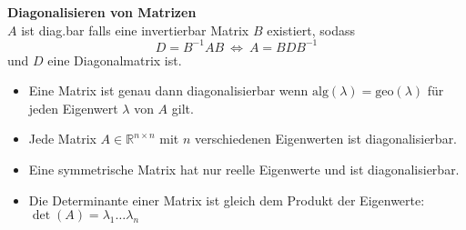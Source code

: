 \documentclass[german, 6pt]{latex4ei/latex4ei_sheet}
\begin{document}
\begin{minipage}{\columnwidth}
\textbf{Diagonalisieren von Matrizen}\\
$A$ ist diag.bar falls eine invertierbar Matrix $B$ existiert, sodass
\begin{equation*}
D=B^{-1}AB \ \Leftrightarrow \ A=BDB^{-1}
\end{equation*}
und $D$ eine Diagonalmatrix ist.
\begin{itemize}\itemsep0pt
\item Eine Matrix ist genau dann diagonalisierbar wenn $\text{alg}(\lambda)=\text{geo}(\lambda)$ für jeden Eigenwert $\lambda$ von $A$ gilt.
\item Jede Matrix $A \in \mathbb{R}^{n\times n}$ mit $n$ verschiedenen Eigenwerten ist diagonalisierbar.
\item Eine symmetrische Matrix hat nur reelle Eigenwerte und ist diagonalisierbar.
\item Die Determinante einer Matrix ist gleich dem Produkt der Eigenwerte: $\det(A)=\lambda_1\dots\lambda_n$
\end{itemize}
\end{minipage}
\end{document}
